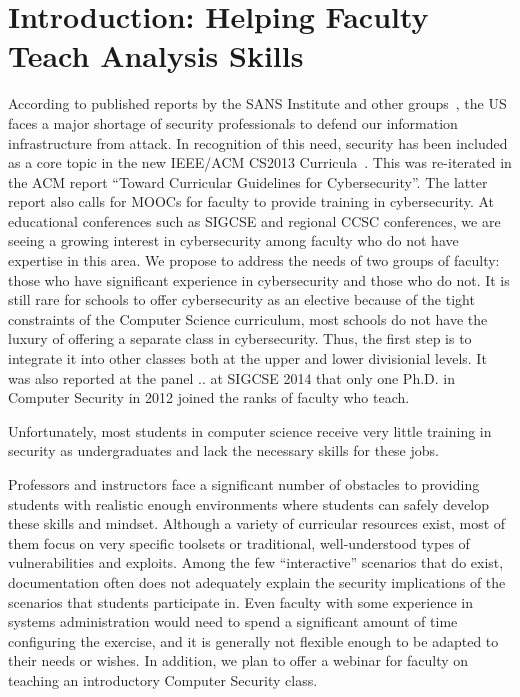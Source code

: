 

%


\section{Introduction: Helping Faculty Teach Analysis Skills}
\label{sec:intro}

According to published reports by the SANS Institute and other 
groups~\cite{defensenewsshortage}, the US faces a major shortage of 
security professionals to defend our information infrastructure from
attack.  In recognition of this need, security has been included as
a core topic in the new 
IEEE/ACM CS2013 Curricula~\cite{acmcurriculum}.   
This was re-iterated in the ACM report ``Toward Curricular Guidelines for Cybersecurity''.
The latter report also calls for MOOCs for faculty to provide training in cybersecurity.
At educational conferences such
as SIGCSE and regional CCSC conferences, we are seeing a growing interest 
in cybersecurity among faculty who do not have expertise in this area.
We propose to address the needs of two groups of faculty: those who have
significant experience in cybersecurity and those who do not.
It is still
rare for schools to offer cybersecurity as an elective
because of the tight 
constraints of the Computer Science curriculum, most schools 
do not have the luxury of offering a separate class in cybersecurity.  Thus, 
the first step is to integrate it into other classes both at the upper and lower divisionial
levels.  It was also reported at the panel .. at SIGCSE 2014 that only one Ph.D. in Computer
Security in 2012 joined the ranks of faculty who teach.

Unfortunately, most students 
in computer science receive very little training in security as
undergraduates and lack the necessary skills 
for these jobs.

 Professors and instructors face a significant number of
obstacles to providing students with realistic enough environments
where students can safely develop these skills and mindset.  Although
a variety of curricular resources exist, most of them focus on very specific
toolsets or traditional, well-understood types of vulnerabilities and
exploits.  Among the few ``interactive'' scenarios that do exist, documentation
 often  does not adequately explain the
security implications of the scenarios that students participate in.  Even faculty
with some experience in systems administration would need to 
spend a significant amount of time configuring the exercise, and it is 
generally not flexible enough to be adapted to their needs or wishes.
In addition, we plan to offer a webinar for faculty on teaching an introductory 
Computer Security class.

